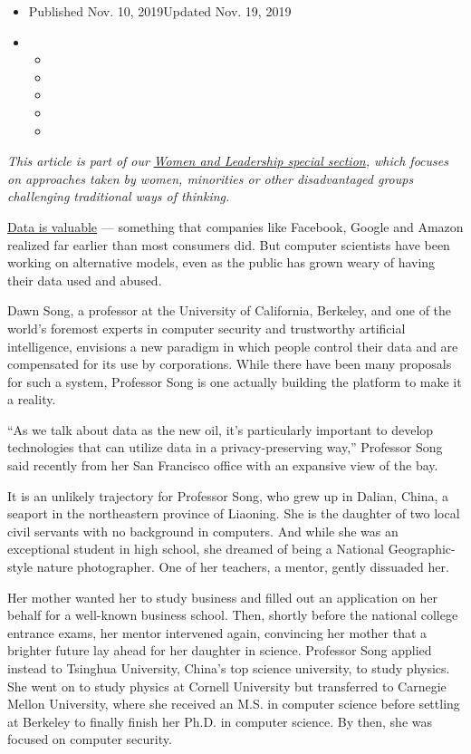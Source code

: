 \begin{itemize}
\item
  Published Nov. 10, 2019Updated Nov. 19, 2019
\item
  \begin{itemize}
  \item
  \item
  \item
  \item
  \item
  \end{itemize}
\end{itemize}

\emph{This article is part of our}
\href{https://www.nytimes.com/spotlight/women-and-leadership}{\emph{Women
and Leadership special section}}\emph{, which focuses on approaches
taken by women, minorities or other disadvantaged groups challenging
traditional ways of thinking.}

\href{https://www.nytimes.com/interactive/2019/09/23/opinion/data-privacy-jaron-lanier.html}{Data
is valuable} --- something that companies like Facebook, Google and
Amazon realized far earlier than most consumers did. But computer
scientists have been working on alternative models, even as the public
has grown weary of having their data used and abused.

Dawn Song, a professor at the University of California, Berkeley, and
one of the world's foremost experts in computer security and trustworthy
artificial intelligence, envisions a new paradigm in which people
control their data and are compensated for its use by corporations.
While there have been many proposals for such a system, Professor Song
is one actually building the platform to make it a reality.

``As we talk about data as the new oil, it's particularly important to
develop technologies that can utilize data in a privacy-preserving
way,'' Professor Song said recently from her San Francisco office with
an expansive view of the bay.

It is an unlikely trajectory for Professor Song, who grew up in Dalian,
China, a seaport in the northeastern province of Liaoning. She is the
daughter of two local civil servants with no background in computers.
And while she was an exceptional student in high school, she dreamed of
being a National Geographic-style nature photographer. One of her
teachers, a mentor, gently dissuaded her.

Her mother wanted her to study business and filled out an application on
her behalf for a well-known business school. Then, shortly before the
national college entrance exams, her mentor intervened again, convincing
her mother that a brighter future lay ahead for her daughter in science.
Professor Song applied instead to Tsinghua University, China's top
science university, to study physics. She went on to study physics at
Cornell University but transferred to Carnegie Mellon University, where
she received an M.S. in computer science before settling at Berkeley to
finally finish her Ph.D. in computer science. By then, she was focused
on computer security.

